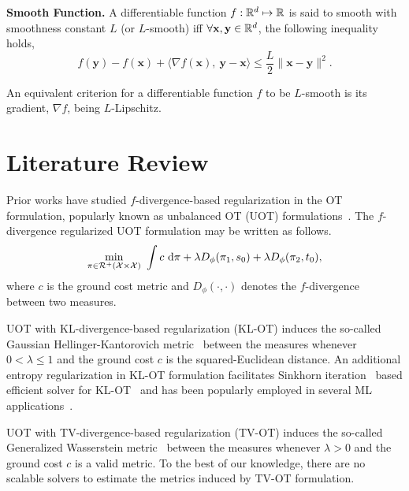 \begin{definitionBox}
\begin{definition}{\textbf{Smooth Function.}}\label{defn:f-L-smooth}\newline
A differentiable function $f: \mathbb{R}^d\mapsto \mathbb{R}$ is said to smooth with smoothness constant $L$ (or $L$-smooth) iff $\forall \mathbf{x}, \mathbf{y}\in \mathbb{R}^d$, the following inequality holds,
\begin{equation*}
    f(\mathbf{y})-f(\mathbf{x}) + \langle \nabla f(\mathbf{x}), \ \mathbf{y}-\mathbf{x} \rangle \leq \frac{L}{2}\|\mathbf{x}-\mathbf{y}\|^2.
\end{equation*}
\end{definition}
\end{definitionBox}
An equivalent criterion for a differentiable function $f$ to be $L$-smooth is its gradient, $\nabla f$, being $L$-Lipschitz.

\section{Literature Review}\label{sec:related}
Prior works have studied $ f$-divergence-based regularization in the OT formulation, popularly known as unbalanced OT (UOT)  formulations~\citep{Liero2018,chizat18a}. The $f$-divergence regularized UOT formulation \citep{chizat17} may be written as follows.
\begin{equation}\label{eqn:kl}
\min\limits_{\pi\in\calR^+\left(\calX\times\calX\right)}\ \int c\ \textup{d}\pi + \lambda D_\phi(\pi_1,s_0) + \lambda D_\phi(\pi_2,t_0),
\end{equation}
where $c$ is the ground cost metric and $D_\phi(\cdot,\cdot)$ denotes the $f$-divergence~\citep{Csiszar67,Sriperumbudur09onintegral} between two measures. 

UOT with KL-divergence-based regularization (KL-OT) induces the so-called Gaussian Hellinger-Kantorovich metric~\citep{Liero2018} between the measures whenever $0<\lambda\leq 1$ and the ground cost $c$ is the squared-Euclidean distance.
An additional entropy regularization in KL-OT formulation facilitates Sinkhorn iteration~\citep{knight08a} based efficient solver for KL-OT~\citep{ChizatPSV18} and has been popularly employed in several ML applications~\citep{jumbot, ijcai2020p516,arase-etal-2023-unbalanced, De_Plaen_2023_CVPR}.

UOT with TV-divergence-based regularization (TV-OT) induces the so-called Generalized Wasserstein metric~\citep{Piccoli2014GeneralizedWD} between the measures whenever $\lambda>0$ and the ground cost $c$ is a valid metric. To the best of our knowledge, there are no scalable solvers to estimate the metrics induced by TV-OT formulation.

